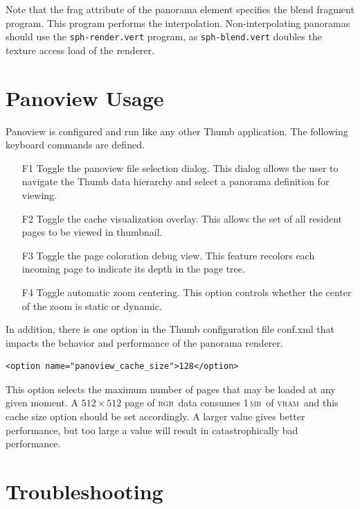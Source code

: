 \documentclass[oneside,11pt]{memoir}
\newcommand{\rgb}     {\textsc{rgb}}
\newcommand{\mb}    {\,\textsc{mb}}
\newcommand{\vram}    {\textsc{vram}}
\begin{document}
\begin{Spacing}{1.1}
Note that the frag attribute of the panorama element specifies the blend fragment program. This program performs the interpolation. Non-interpolating panoramas should use the \texttt{sph-render.vert} program, as \texttt{sph-blend.vert} doubles the texture access load of the renderer.

\section{Panoview Usage}

Panoview is configured and run like any other Thumb application. The following keyboard commands are defined.

\begin{itemize}
\item[F1] Toggle the panoview file selection dialog. This dialog allows the user to navigate the Thumb data hierarchy and select a panorama definition for viewing.

\item[F2] Toggle the cache visualization overlay. This allows the set of all resident pages to be viewed in thumbnail.

\item[F3] Toggle the page coloration debug view. This feature recolors each incoming page to indicate its depth in the page tree.

\item[F4] Toggle automatic zoom centering. This option controls whether the center of the zoom is static or dynamic.
\end{itemize}

In addition, there is one option in the Thumb configuration file conf.xml that impacts the behavior and performance of the panorama renderer.


\begin{verbatim}
<option name="panoview_cache_size">128</option>
\end{verbatim}

This option selects the maximum number of pages that may be loaded at any given moment. A $512\times 512$ page of \rgb\ data consumes 1\mb\ of \vram\, and this cache size option should be set accordingly. A larger value gives better performance, but too large a value will result in catastrophically bad performance.

\section{Troubleshooting}


\end{Spacing}
\end{document}
